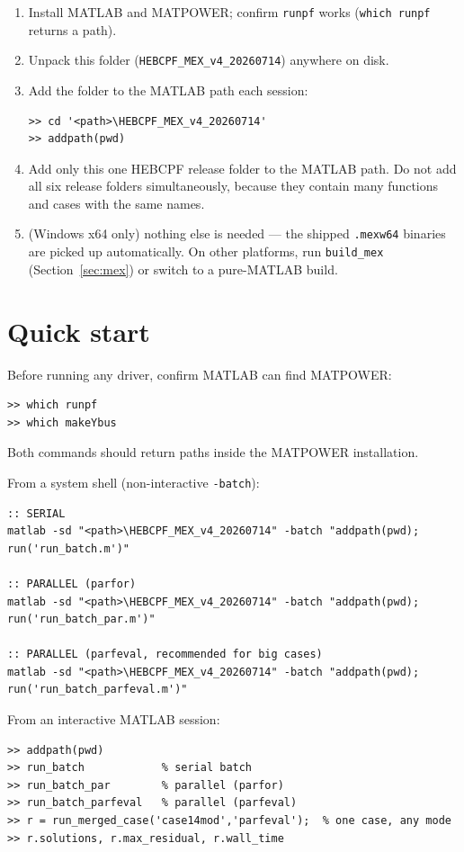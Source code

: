 \documentclass[11pt,a4paper]{article}
\newcommand{\code}[1]{\texttt{#1}}
\begin{document}
\begin{enumerate}[leftmargin=1.6em]
  \item Install MATLAB and MATPOWER; confirm \code{runpf} works
        (\code{which runpf} returns a path).
  \item Unpack this folder (\code{HEBCPF_MEX_v4_20260714}) anywhere on disk.
  \item Add the folder to the MATLAB path each session:
\begin{lstlisting}
>> cd '<path>\HEBCPF_MEX_v4_20260714'
>> addpath(pwd)
\end{lstlisting}
  \item Add only this one HEBCPF release folder to the MATLAB path. Do not add all six
        release folders simultaneously, because they contain many functions and cases with
        the same names.
  \item (Windows x64 only) nothing else is needed --- the shipped \code{.mexw64} binaries
        are picked up automatically. On other platforms, run \code{build_mex}
        (Section~\ref{sec:mex}) or switch to a pure-MATLAB build.
\end{enumerate}

\section{Quick start}

Before running any driver, confirm MATLAB can find MATPOWER:
\begin{lstlisting}[style=mat]
>> which runpf
>> which makeYbus
\end{lstlisting}
Both commands should return paths inside the MATPOWER installation.

From a system shell (non-interactive \code{-batch}):
\begin{lstlisting}[style=sh]
:: SERIAL
matlab -sd "<path>\HEBCPF_MEX_v4_20260714" -batch "addpath(pwd); run('run_batch.m')"

:: PARALLEL (parfor)
matlab -sd "<path>\HEBCPF_MEX_v4_20260714" -batch "addpath(pwd); run('run_batch_par.m')"

:: PARALLEL (parfeval, recommended for big cases)
matlab -sd "<path>\HEBCPF_MEX_v4_20260714" -batch "addpath(pwd); run('run_batch_parfeval.m')"
\end{lstlisting}

From an interactive MATLAB session:
\begin{lstlisting}[style=mat]
>> addpath(pwd)
>> run_batch            % serial batch
>> run_batch_par        % parallel (parfor)
>> run_batch_parfeval   % parallel (parfeval)
>> r = run_merged_case('case14mod','parfeval');  % one case, any mode
>> r.solutions, r.max_residual, r.wall_time
\end{lstlisting}
\end{document}
